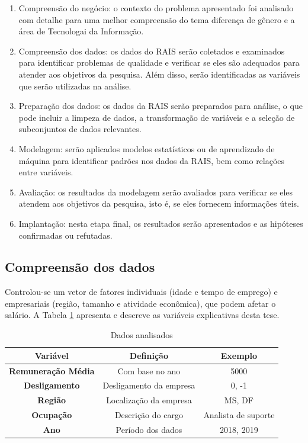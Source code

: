 \begin{enumerate}
	\item Compreensão do negócio: o contexto do problema apresentado foi analisado com detalhe para uma melhor compreensão do tema diferença de gênero e a área de Tecnologai da Informação.
	\item Compreensão dos dados: os dados do RAIS serão coletados e examinados para identificar problemas de qualidade e verificar se eles são adequados para atender aos objetivos da pesquisa. Além disso, serão identificadas as variáveis que serão utilizadas na análise.
	\item Preparação dos dados: os dados da RAIS serão preparados para análise, o que pode incluir a limpeza de dados, a transformação de variáveis e a seleção de subconjuntos de dados relevantes. 
	\item Modelagem: serão aplicados modelos estatísticos ou de aprendizado de máquina para identificar padrões nos dados da RAIS, bem como relações entre variáveis.
	\item Avaliação: os resultados da modelagem serão avaliados para verificar se eles atendem aos objetivos da pesquisa, isto é, se eles fornecem informações úteis.
	\item Implantação: nesta etapa final, os resultados serão apresentados e as hipóteses confirmadas ou refutadas.     	      	      	      	      	      
\end{enumerate}


\subsection{Compreensão dos dados}

Controlou-se um vetor de fatores individuais (idade e tempo de emprego) e empresariais
(região, tamanho e atividade econômica), que podem afetar o salário. A Tabela \ref{vars} apresenta e
descreve as variáveis explicativas desta tese.

\begin{table}[htbp]
	\caption{Dados analisados}
	\begin{center}
		\begin{tabular}{|c|c|c|}
			\hline
			\textbf{Variável}            & \textbf{Definição}     & \textbf{Exemplo}    \\ 
			\hline 
			\textbf{Remuneração Média} & Com base no ano          & 5000                \\
			\hline
			\textbf{Desligamento}         & Desligamento da empresa  & 0, -1               \\
			\hline 
			\textbf{Região}              & Localização da empresa & MS, DF              \\
			\hline 
			\textbf{Ocupação}           & Descrição do cargo     & Analista de suporte \\
			\hline 
			\textbf{Ano}                  & Período dos dados       & 2018, 2019          \\
			\hline
		\end{tabular}
		\label{vars}
	\end{center}
\end{table}


